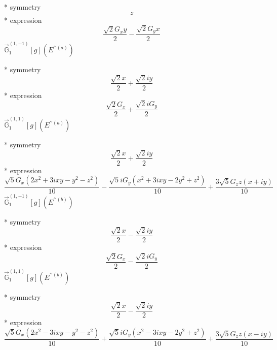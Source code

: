 \documentclass[fleqn,8pt]{jsarticle}
\begin{document}
\noindent\quad ** symmetry
\begin{dmath*}
z
\end{dmath*}
\noindent\quad ** expression
\begin{dmath*}
\frac{\sqrt{2} G_{x} y}{2} - \frac{\sqrt{2} G_{y} x}{2}
\end{dmath*}
\noindent\quad $\vec{\mathbb{G}}_{1}^{(1,-1)}[g](E^{\prime\prime(a)})$

\noindent\quad ** symmetry
\begin{dmath*}
\frac{\sqrt{2} x}{2} + \frac{\sqrt{2} i y}{2}
\end{dmath*}
\noindent\quad ** expression
\begin{dmath*}
\frac{\sqrt{2} G_{x}}{2} + \frac{\sqrt{2} i G_{y}}{2}
\end{dmath*}
\noindent\quad $\vec{\mathbb{G}}_{1}^{(1,1)}[g](E^{\prime\prime(a)})$

\noindent\quad ** symmetry
\begin{dmath*}
\frac{\sqrt{2} x}{2} + \frac{\sqrt{2} i y}{2}
\end{dmath*}
\noindent\quad ** expression
\begin{dmath*}
\frac{\sqrt{5} G_{x} \left(2 x^{2} + 3 i x y - y^{2} - z^{2}\right)}{10} - \frac{\sqrt{5} i G_{y} \left(x^{2} + 3 i x y - 2 y^{2} + z^{2}\right)}{10} + \frac{3 \sqrt{5} G_{z} z \left(x + i y\right)}{10}
\end{dmath*}
\noindent\quad $\vec{\mathbb{G}}_{1}^{(1,-1)}[g](E^{\prime\prime(b)})$

\noindent\quad ** symmetry
\begin{dmath*}
\frac{\sqrt{2} x}{2} - \frac{\sqrt{2} i y}{2}
\end{dmath*}
\noindent\quad ** expression
\begin{dmath*}
\frac{\sqrt{2} G_{x}}{2} - \frac{\sqrt{2} i G_{y}}{2}
\end{dmath*}
\noindent\quad $\vec{\mathbb{G}}_{1}^{(1,1)}[g](E^{\prime\prime(b)})$

\noindent\quad ** symmetry
\begin{dmath*}
\frac{\sqrt{2} x}{2} - \frac{\sqrt{2} i y}{2}
\end{dmath*}
\noindent\quad ** expression
\begin{dmath*}
\frac{\sqrt{5} G_{x} \left(2 x^{2} - 3 i x y - y^{2} - z^{2}\right)}{10} + \frac{\sqrt{5} i G_{y} \left(x^{2} - 3 i x y - 2 y^{2} + z^{2}\right)}{10} + \frac{3 \sqrt{5} G_{z} z \left(x - i y\right)}{10}
\end{dmath*}
\end{document}
